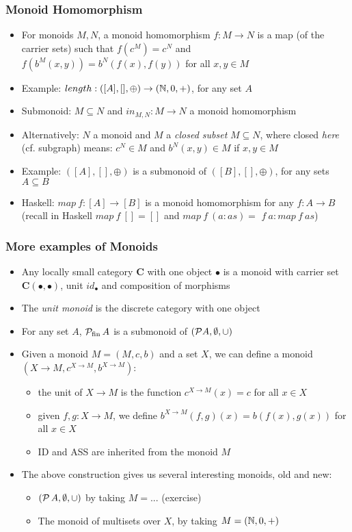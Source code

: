 \documentclass[handout]{beamer}
\newcommand{\bfsf}[1]{{\boldsymbol{#1}}}
\newcommand{\CC}{\bfsf{C}}
\begin{document}
\frame
  {   
    \frametitle{Monoid Homomorphism}\label{Ch2:MonoidHom}

 \begin{itemize}[<+->]
\item For monoids $M,N$, a monoid homomorphism $f: M\to N$ is a
map (of the carrier sets) such that $f(c^M) = c^N$ and $f(b^M(x,y)) = b^N(f(x),f(y))$ for all $x,y\in M$
\item Example: $length : ([A],[],\oplus) \to (\mathbb{N},0,{+})$, for any set $A$
\item Submonoid: $M\subseteq N$ and $in_{M,N}: M\to N$ a monoid homomorphism
\item Alternatively: $N$ a monoid and $M$ a \emph{closed subset} $M\subseteq N$,
where closed \emph{here} (cf. subgraph) means: $c^N \in M$ and $b^N(x,y)\in M$ if $x,y\in M$
\item Example:  $([A],[],\oplus)$ is a submonoid of  $([B],[],\oplus)$, for any sets $A\subseteq B$
\item Haskell: $map~f: [A] \to [B]$ is a monoid 
homomorphism for any $f: A\to B$ (recall in Haskell $map~f~[] = []$ and $map~f~(a:as) =$ 
$ f~a : map~f~as$)
 \end{itemize}

 }

\frame
  {   
    \frametitle{More examples of Monoids}\label{Ch2:ExaMonoid}

 \begin{itemize}[<+->]
\item Any locally small category $\CC$ with one object $\bullet$ is a 
monoid with carrier set $\CC(\bullet,\bullet)$, unit $id_\bullet$ and composition
of morphisms %
\item The \emph{unit monoid} is the discrete category with one object
\item For any set $A$, $\operatorname{\mathcal{P}_{fin}} A$ is a submonoid of $({\operatorname{\mathcal{P}}} A,\emptyset,{\cup})$
\item Given a monoid $M=(M,c,b)$ and a set $X$, we can define a monoid 
$(X\to M , c^{X\to M}, b^{X\to M})$:
   \begin{itemize}[<+->]
\item the unit of $X\to M$ is the function $c^{X\to M}(x) =c$ for all $x\in X$
\item given $f,g: X\to M$, we define $b^{X\to M}(f,g)(x) = b(f(x),g(x))$ for all $x\in X$
\item ID and ASS are inherited from the monoid $M$
   \end{itemize}
\item The above construction gives us several interesting monoids, old and new:
   \begin{itemize}[<+->]
\item $(\operatorname{\mathcal{P}} A,\emptyset,{\cup})$ by taking $M= ...$ (exercise) 
\item The monoid of multisets  over $X$, by taking $M=(\mathbb{N},0,{+})$
   \end{itemize}
 \end{itemize}

 }
\end{document}
